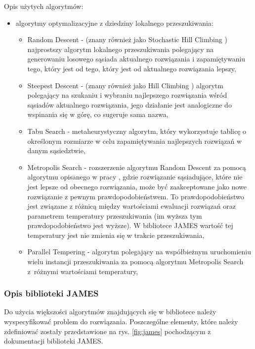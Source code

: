 Opis użytych algorytmów:
\begin{itemize}
    \item algorytmy optymalizacyjne z dziedziny lokalnego przeszukiwania:
        \begin{itemize}
            \item Random Descent - (znany również jako Stochastic Hill Climbing \cite{hillclimbing}) najprostszy algorytm lokalnego przeszukiwania polegający na generowaniu losowego sąsiada aktualnego rozwiązania i zapamiętywaniu tego, który jest od tego, który jest od aktualnego rozwiązania lepszy,
            \item Steepest Descent - (znany również jako Hill Climbing \cite{hillclimbing}) algorytm polegający na szukaniu i wybraniu najlepszego rozwiązania wśród sąsiadów aktualnego rozwiązania, jego działanie jest analogiczne do wspinania się w górę, co sugeruje sama nazwa,
            \item Tabu Search \cite{tabusearch} -  metaheurystyczny algorytm, który wykorzystuje tablicę o określonym rozmiarze w celu zapamiętywania najlepszych rozwiązań w danym sąsiedztwie,
            \item Metropolis Search - rozszerzenie algorytmu Random Descent za pomocą algorytmu opisanego w pracy \cite{metropolis}, gdzie rozwiązanie sąsiadujące, które nie jest lepsze od obecnego rozwiązania, może być zaakceptowane jako nowe rozwiązanie z pewnym prawdopodobieństwem. To prawdopodobieństwo jest związane z różnicą między wartościami ewaluacji rozwiązań oraz parametrem temperatury przeszukiwania (im wyższa tym prawdopodobieństwo jest wyższe). W bibliotece JAMES wartość tej temperatury jest nie zmienia się w trakcie przeszukiwania,
            \item Parallel Tempering \cite{paralleltempering} - algorytm polegający na współbieżnym uruchomieniu wielu instancji przeszukiwania za pomocą algorytmu Metropolis Search z~różnymi wartościami temperatury, 
        \end{itemize}
\end{itemize}   

\subsubsection{Opis biblioteki JAMES}\label{sec:james}
Do użycia większości algorytmów znajdujących się w bibliotece należy wyspecyfikować problem do rozwiązania. Poszczególne elementy, które należy zdefiniować zostały przedstawione na rys. \ref{fig:james} pochodzącym z dokumentacji biblioteki JAMES. 

